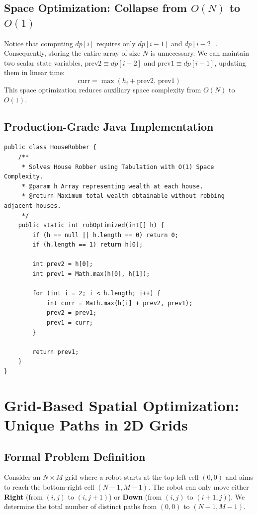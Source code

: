 \documentclass[10pt,journal,compsoc,onecolumn]{IEEEtran}
\begin{document}
\subsection{Space Optimization: Collapse from $O(N)$ to $O(1)$}

Notice that computing $dp[i]$ requires only $dp[i-1]$ and $dp[i-2]$. Consequently, storing the entire array of size $N$ is unnecessary. We can maintain two scalar state variables, $\text{prev2} \equiv dp[i-2]$ and $\text{prev1} \equiv dp[i-1]$, updating them in linear time:
\[
\text{curr} = \max(h_i + \text{prev2}, \, \text{prev1})
\]
This space optimization reduces auxiliary space complexity from $O(N)$ to $O(1)$.

\subsection{Production-Grade Java Implementation}

\begin{verbatim}
public class HouseRobber {
    /**
     * Solves House Robber using Tabulation with O(1) Space Complexity.
     * @param h Array representing wealth at each house.
     * @return Maximum total wealth obtainable without robbing adjacent houses.
     */
    public static int robOptimized(int[] h) {
        if (h == null || h.length == 0) return 0;
        if (h.length == 1) return h[0];

        int prev2 = h[0];
        int prev1 = Math.max(h[0], h[1]);

        for (int i = 2; i < h.length; i++) {
            int curr = Math.max(h[i] + prev2, prev1);
            prev2 = prev1;
            prev1 = curr;
        }

        return prev1;
    }
}
\end{verbatim}

\section{Grid-Based Spatial Optimization: Unique Paths in 2D Grids}
\label{sec:unique-paths}

\subsection{Formal Problem Definition}

Consider an $N \times M$ grid where a robot starts at the top-left cell $(0,0)$ and aims to reach the bottom-right cell $(N-1, M-1)$. The robot can only move either \textbf{Right} (from $(i,j)$ to $(i, j+1)$) or \textbf{Down} (from $(i,j)$ to $(i+1, j)$). We determine the total number of distinct paths from $(0,0)$ to $(N-1, M-1)$.
\end{document}
